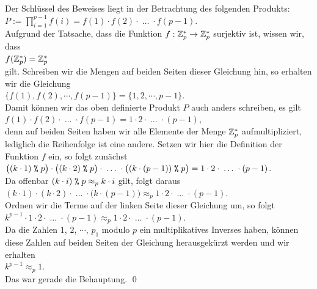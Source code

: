 Der Schl\"{u}ssel des Beweises liegt in der Betrachtung des folgenden Produkts:
\\[0.2cm]
\hspace*{1.3cm}
$P := \prod\limits_{i=1}^{p-1} f(i) = f(1) \cdot f(2) \cdot \;\dots\; \cdot f(p-1)$.
\\[0.2cm]
Aufgrund der Tatsache, dass die Funktion $f:\mathbb{Z}_{p}^* \rightarrow \mathbb{Z}_{p}^*$ surjektiv ist, wissen  wir, dass
\\[0.2cm]
\hspace*{1.3cm}
$f(\mathbb{Z}_{p}^*) = \mathbb{Z}_{p}^*$
\\[0.2cm]
gilt. Schreiben  wir die Mengen auf beiden Seiten dieser Gleichung hin, so erhalten wir die Gleichung
\\[0.2cm]
\hspace*{1.3cm}
$\bigl\{ f(1), f(2), \cdots, f(p-1) \bigr\} = \bigl\{ 1, 2, \cdots, p-1 \bigr\}$.
\\[0.2cm]
Damit k\"{o}nnen wir das oben definierte Produkt $P$ auch anders schreiben, es gilt
\\[0.2cm]
\hspace*{1.3cm}
$f(1) \cdot f(2) \cdot \;\dots\; \cdot f(p-1) = 1 \cdot 2 \cdot \;\dots\; \cdot (p-1)$,
\\[0.2cm]
denn auf beiden Seiten haben wir alle Elemente der Menge $\mathbb{Z}_{p}^*$ aufmultipliziert, lediglich die
Reihenfolge ist eine andere.  Setzen wir hier die Definition der Funktion $f$ ein, so
folgt zun\"{a}chst
\\[0.2cm]
\hspace*{1.3cm}
$\bigl((k \cdot 1) \;\texttt{\%}\; p\bigr) \cdot \bigl((k \cdot 2) \;\texttt{\%}\; p\bigr) \cdot \;\dots\; \cdot 
 \bigl((k \cdot (p-1)) \;\texttt{\%}\; p\bigr) =
  1 \cdot 2 \cdot \;\dots\; \cdot (p-1)$.
\\[0.2cm]
Da offenbar $(k \cdot i) \;\texttt{\%}\; p \approx_p k \cdot i$ gilt, folgt daraus
\\[0.2cm]
\hspace*{1.3cm}
$(k \cdot 1) \cdot (k \cdot 2) \cdot \;\dots\; \cdot \bigl(k\cdot(p-1)) \approx_p 
  1 \cdot 2 \cdot \;\dots\; \cdot (p-1)$.
\\[0.2cm]
Ordnen wir die Terme auf der linken Seite dieser Gleichung um, so folgt
\\[0.2cm]
\hspace*{1.3cm}
$k^{p-1} \cdot 1 \cdot 2 \cdot \;\dots\; \cdot (p-1) \approx_p
  1 \cdot 2 \cdot \;\dots\; \cdot (p-1)
$.
\\[0.2cm]
Da die Zahlen $1$, $2$, $\cdots$, $p_1$ modulo $p$ ein multiplikatives Inverses haben, k\"{o}nnen diese Zahlen
auf beiden Seiten der Gleichung herausgek\"{u}rzt werden und wir erhalten
\\[0.2cm]
\hspace*{1.3cm}
$k^{p-1} \approx_p 1$.
\\[0.2cm]
Das war gerade die Behauptung. \qed


